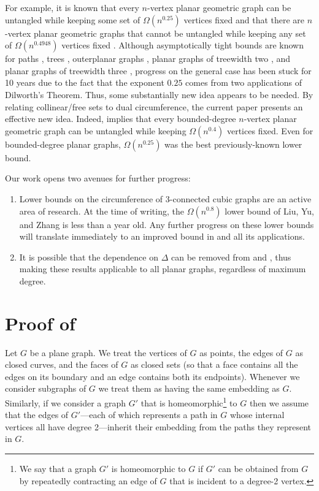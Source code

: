 \documentclass{patmorin}
\begin{document}
For example, it is known that every $n$-vertex planar geometric graph
can be untangled while keeping some set of $\Omega(n^{0.25})$ vertices
fixed \cite{bose.dujmovic.ea:polynomial} and that there are $n$-vertex
planar geometric graphs that cannot be untangled while keeping any set of
$\Omega(n^{0.4948})$ vertices fixed \cite{cano.toth.ea:upper}. Although
asymptotically tight bounds are known for paths \cite{cibulka:untangling},
trees \cite{goaoc.kratochvil.ea:untangling}, outerplanar graphs
\cite{goaoc.kratochvil.ea:untangling}, planar graphs of treewidth
two \cite{ravsky.verbitsky:on}, and planar graphs of treewidth three
\cite{dalozzo.dujmovic.ea:drawing}, progress on the general case has
been stuck for 10 years due to the fact that the exponent $0.25$ comes
from two applications of Dilworth's Theorem.  Thus, some substantially
new idea appears to be needed. By relating collinear/free sets to
dual circumference, the current paper presents an effective new idea.
Indeed,  implies that every bounded-degree $n$-vertex
planar geometric graph can be untangled while keeping $\Omega(n^{0.4})$
vertices fixed.  Even for bounded-degree planar graphs,
$\Omega(n^{0.25})$ was the best previously-known lower bound.

Our work opens two avenues for further progress:

\begin{enumerate}
   \item Lower bounds on the circumference of
      3-connected cubic graphs are an active area of research. At the time of writing, the $\Omega(n^{0.8})$ lower bound of Liu, Yu, and Zhang
      \cite{liu.yu.zhang:circumference} is less than a year old.  Any
      further progress on these lower bounds will translate immediately
      to an improved bound in  and all its applications.

   \item It is possible that the dependence on $\Delta$ can be removed
      from  and , thus making these results
      applicable to all planar graphs, regardless of maximum degree.
\end{enumerate}

\section{Proof of }

Let $G$ be a plane graph.  We treat the vertices of $G$ as points,
the edges of $G$ as closed curves, and the faces of $G$ as closed sets
(so that a face contains all the edges on its boundary and an edge
contains both its endpoints).  Whenever we consider subgraphs of $G$
we treat them as having the same embedding as $G$.  Similarly, if we
consider a graph $G'$ that is homeomorphic\footnote{We say that a graph $G'$ is homeomorphic to $G$ if $G'$ can be obtained from $G$ by repeatedly contracting an edge of $G$ that is incident to a degree-2 vertex.} to $G$ then we assume
that the edges of $G'$---each of which represents a path in $G$
whose internal vertices all have degree 2---inherit their embedding from
the paths they represent in $G$.
\end{document}
